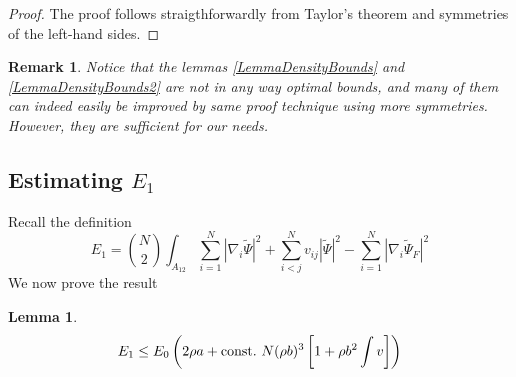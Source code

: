 \documentclass[a4paper,11pt]{article}
\newcommand{\abs}[1]{\left\lvert #1 \right\rvert}
\newtheorem{lemma}{Lemma}
\newtheorem{remark}{Remark}
\numberwithin{equation}{section}
\begin{document}
			\begin{proof}
				The proof follows straigthforwardly from Taylor's theorem and symmetries of the left-hand sides. 
			\end{proof}
			\begin{remark}
				Notice that the lemmas \ref{LemmaDensityBounds} and \ref{LemmaDensityBounds2} are not in any way optimal bounds, and many of them can indeed easily be improved by same proof technique using more symmetries. However, they are sufficient for our needs.
			\end{remark}
	\subsection{Estimating $ E_1 $}
		Recall the definition \begin{equation}
		E_1=\binom{N}{2}\int_{A_{12}} \sum_{i=1}^{N}\abs{\nabla_i\tilde{\Psi}}^2+\sum_{i<j}^{N}v_{ij}\abs{\tilde{\Psi}}^2-\sum_{i=1}^{N}\abs{\nabla_i\tilde{\Psi}_F}^2
		\end{equation}
		We now prove the result \begin{lemma}\label{LemmaE1Bound}
			\begin{equation}
			E_1\leq E_0 \left(2\rho a+ \textnormal{const.}\ N(\rho b)^3\left[ 1+ \rho b^2\int v\right]\right)
			\end{equation}
		\end{lemma}
\end{document}
